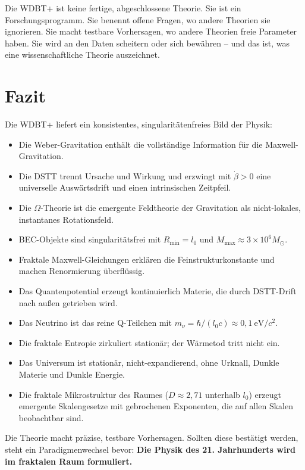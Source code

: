 \documentclass[12pt,a4paper]{article}
\begin{document}
Die WDBT+ ist keine fertige, abgeschlossene Theorie. Sie ist ein Forschungsprogramm. Sie benennt offene Fragen, wo andere Theorien sie ignorieren. Sie macht testbare Vorhersagen,
wo andere Theorien freie Parameter haben. Sie wird an den Daten scheitern oder sich bewähren -- und das ist, was eine wissenschaftliche Theorie auszeichnet.

\section{Fazit}

Die WDBT+ liefert ein konsistentes, singularitätenfreies Bild der Physik:

\begin{itemize}
\item Die Weber-Gravitation enthält die vollständige Information für die Maxwell-\\Gravitation.
\item Die DSTT trennt Ursache und Wirkung und erzwingt mit $\dot{\beta} > 0$ eine universelle Auswärtsdrift und einen intrinsischen Zeitpfeil.
\item Die $\Omega$-Theorie ist die emergente Feldtheorie der Gravitation als nicht-lokales, instantanes Rotationsfeld.
\item BEC-Objekte sind singularitätsfrei mit $R_{\min} = l_0$ und $M_{\max} \approx 3 \times 10^6 M_{\odot}$.
\item Fraktale Maxwell-Gleichungen erklären die Feinstrukturkonstante und machen Renormierung überflüssig.
\item Das Quantenpotential erzeugt kontinuierlich Materie, die durch DSTT-Drift nach außen getrieben wird.
\item Das Neutrino ist das reine Q-Teilchen mit $m_\nu = \hbar/(l_0c) \approx 0,1\ \text{eV}/c^2$.
\item Die fraktale Entropie zirkuliert stationär; der Wärmetod tritt nicht ein.
\item Das Universum ist stationär, nicht-expandierend, ohne Urknall, Dunkle Materie und Dunkle Energie.
\item Die fraktale Mikrostruktur des Raumes ($D \approx 2,71$ unterhalb $l_0$) erzeugt emergente Skalengesetze mit gebrochenen Exponenten, die auf allen Skalen beobachtbar sind.
\end{itemize}

Die Theorie macht präzise, testbare Vorhersagen. Sollten diese bestätigt werden, steht ein Paradigmenwechsel bevor: \textbf{Die Physik des 21. Jahrhunderts wird im fraktalen Raum formuliert.}
\end{document}
